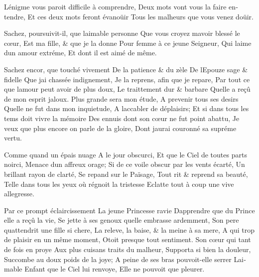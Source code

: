 \documentclass[14pt,a4paper]{memoir}
\begin{document}
{{\begin{otherlanguage}{french}
{L\textquotesingle énigme vous paroit difficile à comprendre,} {Deux
mots vont vous la faire entendre,} {Et ces deux mots feront évanoüir}
{Tous les malheurs que vous venez d\textquotesingle oüir.}

{Sachez, poursuivit-il, que l\textquotesingle aimable personne} {Que
vous croyez m\textquotesingle avoir blessé le cœur,} {Est ma fille, \&
que je la donne} {Pour femme à ce jeune Seigneur,} {Qui
l\textquotesingle aime d\textquotesingle un amour extréme,} {Et dont il
est aimé de même.}

{Sachez encor, que touché vivement} {De la patience \& du zèle} {De
l\textquotesingle Epouze sage \& fidelle} {Que j\textquotesingle ai
chassée indignement,} {Je la reprens, afin que je repare,} {Par tout ce
que l\textquotesingle amour peut avoir de plus doux, } {Le traittement
dur \& barbare} {Qu\textquotesingle elle a reçû de mon esprit jaloux.}
{Plus grande sera mon étude,} {A prevenir tous ses desirs}
{Qu\textquotesingle elle ne fut dans mon inquietude,} {A
l\textquotesingle accabler de déplaisirs;} {Et si dans tous les tems
doit vivre la mémoire} {Des ennuis dont son cœur ne fut point abattu,}
{Je veux que plus encore on parle de la gloire,} {Dont
j\textquotesingle aurai couronné sa supréme vertu.}

{Comme quand un épais nuage} {A le jour obscurci,} {Et que le Ciel de
toutes parts noirci,} {Menace d\textquotesingle un affreux orage;} {Si
de ce voile obscur par les vents écarté,} {Un brillant rayon de clarté,}
{Se repand sur le Païsage,} {Tout rit \& reprend sa beauté,} {Telle dans
tous les yeux où régnoit la tristesse } {Eclatte tout à coup une vive
allegresse.}

{Par ce prompt éclaircissement} {La jeune Princesse ravie}
{D\textquotesingle apprendre que du Prince elle a reçû la vie,} {Se
jette à ses genoux qu\textquotesingle elle embrasse ardemment, } {Son
pere qu\textquotesingle attendrit une fille si chere,} {La releve, la
baise, \& la meine à sa mere,} {A qui trop de plaisir en un même
moment,} {Otoit presque tout sentiment.} {Son cœur qui tant de fois en
proye} {Aux plus cuisans traits du malheur,} {Supporta si bien la
douleur,} {Succombe au doux poids de la joye;} {A peine de ses bras
pouvoit-elle serrer} {L\textquotesingle aimable Enfant que le Ciel lui
renvoye,} {Elle ne pouvoit que pleurer.}


\end{otherlanguage}}}
\end{document}
